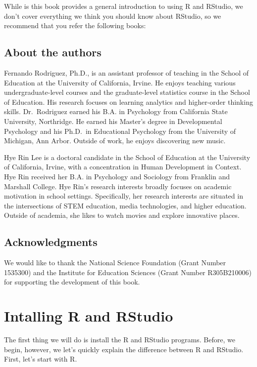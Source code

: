 \documentclass[
]{book}
\begin{document}
While is this book provides a general introduction to using R and RStudio, we don't cover everything we think you should know about RStudio, so we recommend that you refer the following books:

\hypertarget{about-the-authors}{%
\section{About the authors}\label{about-the-authors}}

Fernando Rodriguez, Ph.D., is an assistant professor of teaching in the School of Education at the University of California, Irvine. He enjoys teaching various undergraduate-level courses and the graduate-level statistics course in the School of Education. His research focuses on learning analytics and higher-order thinking skills. Dr.~Rodriguez earned his B.A. in Psychology from California State University, Northridge. He earned his Master's degree in Developmental Psychology and his Ph.D.~in Educational Psychology from the University of Michigan, Ann Arbor. Outside of work, he enjoys discovering new music.

Hye Rin Lee is a doctoral candidate in the School of Education at the University of California, Irvine, with a concentration in Human Development in Context. Hye Rin received her B.A. in Psychology and Sociology from Franklin and Marshall College. Hye Rin's research interests broadly focuses on academic motivation in school settings. Specifically, her research interests are situated in the intersections of STEM education, media technologies, and higher education. Outside of academia, she likes to watch movies and explore innovative places.

\hypertarget{acknowledgments}{%
\section{Acknowledgments}\label{acknowledgments}}

We would like to thank the National Science Foundation (Grant Number 1535300) and the Institute for Education Sciences (Grant Number R305B210006) for supporting the development of this book.

\hypertarget{intalling-r-and-rstudio}{%
\chapter{Intalling R and RStudio}\label{intalling-r-and-rstudio}}

The first thing we will do is install the R and RStudio programs. Before, we begin, however, we let's quickly explain the difference between R and RStudio. First, let's start with R.
\end{document}
